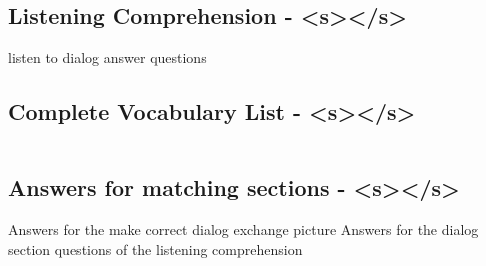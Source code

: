 \subsection{Listening Comprehension - <s></s>}
\noindent listen to dialog answer questions

\subsection{Complete Vocabulary List - <s></s>}
\begin{tabular}{p{3.5cm} p{11cm}}
    
    
    
\end{tabular}

\subsection{Answers for matching sections - <s></s>}
\noindent Answers for the make correct dialog exchange picture Answers for the dialog section questions of the listening comprehension